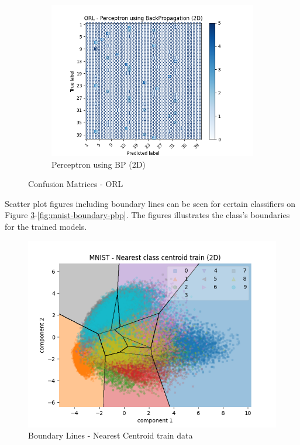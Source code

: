 \begin{figure}[htbp]
        \begin{subfigure}[b]{0.33\linewidth}
                \centering
                \includegraphics[width=1\linewidth]{../source/orl/pictures/perceptronBP-confusion-2d.png}
                \caption{Perceptron using BP (2D)}
                \label{fig:orl-confusion-pbp-2}
        \end{subfigure}
        \caption{Confusion Matrices - ORL}
        \label{fig:orl-confusion}
\end{figure}

Scatter plot figures including boundary lines can be seen for certain classifiers on Figure \ref{fig:mnist-boundary-ncc}-\ref{fig:mnist-boundary-pbp}. The figures illustrates the class's boundaries for the trained models. 

\begin{figure}[htbp]
        \centering
        \includegraphics[width=1\columnwidth]{../source/mnist/pictures/nearestClassCentroid-boundary-train.png}
        \caption{Boundary Lines - Nearest Centroid train data}
        \label{fig:mnist-boundary-ncc}
\end{figure}

